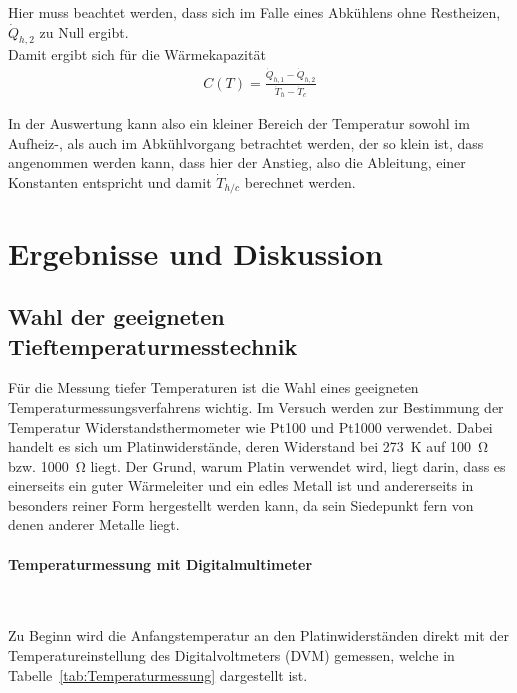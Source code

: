\documentclass[parskip=half, a4paper,twoside,final]{article}
\begin{document}
Hier muss beachtet werden, dass sich im Falle eines Abkühlens ohne Restheizen, $\dot{Q}_{h,2}$ zu Null ergibt.\\
Damit ergibt sich für die Wärmekapazität
\begin{align}\label{equ:DS}
  C(T) = \frac{\dot{Q}_{h,1}-\dot{Q}_{h,2}}{\dot{T}_h - \dot{T}_c}
\end{align}

In der Auswertung kann also ein kleiner Bereich der Temperatur sowohl im Aufheiz-, als auch im Abkühlvorgang betrachtet werden, der so klein ist, dass angenommen werden kann, dass hier der Anstieg, also die Ableitung, einer Konstanten entspricht und damit $\dot{T}_{h/c}$ berechnet werden.

\newpage
\section{Ergebnisse und Diskussion}\label{sec:ErgebnisseUndDiskussion}

\subsection{Wahl der geeigneten Tieftemperaturmesstechnik}
Für die Messung tiefer Temperaturen ist die Wahl eines geeigneten Temperaturmessungsverfahrens wichtig. Im Versuch werden zur Bestimmung der Temperatur Widerstandsthermometer wie Pt100 und Pt1000 verwendet. Dabei handelt es sich um Platinwiderstände, deren Widerstand bei \SI{273}{\kelvin} auf \SI{100}{\ohm} bzw. \SI{1000}{\ohm} liegt. Der Grund, warum Platin verwendet wird, liegt darin, dass es einerseits ein guter Wärmeleiter und ein edles Metall ist und andererseits in besonders reiner Form hergestellt werden kann, da sein Siedepunkt fern von denen anderer Metalle liegt.

\paragraph{Temperaturmessung mit Digitalmultimeter}$~$

Zu Beginn wird die Anfangstemperatur an den Platinwiderständen direkt mit der Temperatureinstellung des Digitalvoltmeters (DVM) gemessen, welche in Tabelle~\ref{tab:Temperaturmessung} dargestellt ist.
\end{document}
